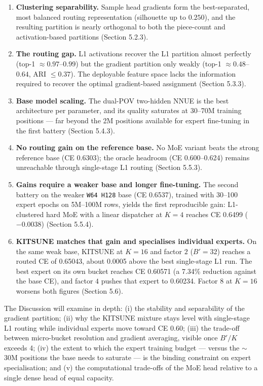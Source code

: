 \begin{enumerate}
	\item \textbf{Clustering separability.} Sample head gradients form the best-separated, most balanced routing representation (silhouette up to $0.250$), and the resulting partition is nearly orthogonal to both the piece-count and activation-based partitions (Section 5.2.3).
	\item \textbf{The routing gap.} L1 activations recover the L1 partition almost perfectly (top-1 $\approx 0.97$--$0.99$) but the gradient partition only weakly (top-1 $\approx 0.48$--$0.64$, ARI $\leq 0.37$). The deployable feature space lacks the information required to recover the optimal gradient-based assignment (Section 5.3.3).
	\item \textbf{Base model scaling.} The dual-POV two-hidden NNUE is the best architecture per parameter, and its quality saturates at 30--70M training positions — far beyond the 2M positions available for expert fine-tuning in the first battery (Section 5.4.3).
	\item \textbf{No routing gain on the reference base.} No MoE variant beats the strong reference base (CE 0.6303); the oracle headroom (CE 0.600--0.624) remains unreachable through single-stage L1 routing (Section 5.5.3).
	\item \textbf{Gains require a weaker base and longer fine-tuning.} The second battery on the weaker \texttt{W64 H128} base (CE 0.6537), trained with 30--100 expert epochs on 5M--100M rows, yields the first reproducible gain: L1-clustered hard MoE with a linear dispatcher at $K=4$ reaches CE 0.6499 ($-0.0038$) (Section 5.5.4).
	\item \textbf{KITSUNE matches that gain and specialises individual experts.} On the same weak base, KITSUNE at $K=16$ and factor $2$ ($B'=32$) reaches a routed CE of 0.65043, about 0.0005 above the best single-stage L1 run. The best expert on its own bucket reaches CE 0.60571 (a 7.34\% reduction against the base CE), and factor $4$ pushes that expert to 0.60234. Factor $8$ at $K=16$ worsens both figures (Section 5.6).
\end{enumerate}

The Discussion will examine in depth: (i) the stability and separability of the gradient partition; (ii) why the KITSUNE mixture stays level with single-stage L1 routing while individual experts move toward CE 0.60; (iii) the trade-off between micro-bucket resolution and gradient averaging, visible once $B'/K$ exceeds 4; (iv) the extent to which the expert training budget — versus the $\sim$30M positions the base needs to saturate — is the binding constraint on expert specialisation; and (v) the computational trade-offs of the MoE head relative to a single dense head of equal capacity.
